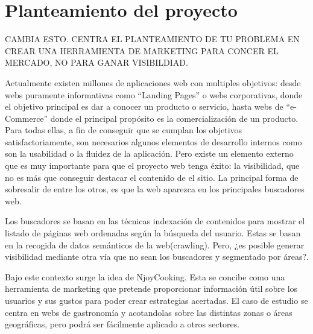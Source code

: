 \section{Planteamiento del proyecto}

CAMBIA ESTO. CENTRA EL PLANTEAMIENTO DE TU PROBLEMA EN CREAR UNA HERRAMIENTA DE MARKETING PARA CONCER EL MERCADO, NO PARA GANAR VISIBILDIAD.

Actualmente existen millones de aplicaciones web con multiples objetivos: desde webs puramente informativas como ``Landing Pages'' o webs
corporativas, donde el objetivo principal es dar a conocer un producto o servicio, hasta webs de ``e-Commerce'' donde el principal propósito es la comercialización de un producto. Para todas ellas, a fin de conseguir que se cumplan los objetivos satisfactoriamente, son necesarios algunos elementos de desarrollo internos como son la usabilidad o la fluidez de la aplicación. Pero existe un elemento externo que es muy importante para que el proyecto web tenga éxito: la visibilidad, que no es más que conseguir destacar el contenido de el sitio. La principal forma de sobresalir de entre los otros, es que la web aparezca en los principales buscadores web.

\vspace{5 mm}

Los buscadores se basan en las técnicas indexación de contenidos para mostrar el listado de páginas web ordenadas según la búsqueda del usuario.
Estas se basan en la recogida de datos semánticos de la web(crawling). Pero, ¿es posible generar visibilidad mediante otra vía que no sean los buscadores
y segmentado por áreas?.

\vspace{5 mm}

Bajo este contexto surge la idea de NjoyCooking. Esta se concibe como una herramienta de
marketing que pretende proporcionar información útil sobre los usuarios y sus gustos para poder crear estrategias acertadas. El caso de estudio se centra en webs de gastronomía y acotandolas sobre las distintas zonas o áreas geográficas, pero podrá ser fácilmente aplicado a otros sectores.
